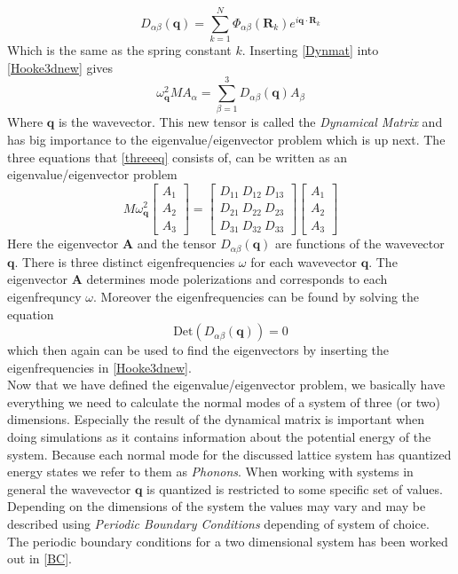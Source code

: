 \begin{equation}
    D_{\alpha\beta}(\mathbf{q})=\sum_{k=1}^{N}\Phi_{\alpha\beta}(\mathbf{R}_{k})e^{i\mathbf{q}\cdot\mathbf{R}_{k}}\label{Dynmat}
\end{equation}
Which is the same as the spring constant $k$. Inserting \cref{Dynmat} into \cref{Hooke3dnew} gives
\begin{equation}
    \omega_{\mathbf{q}}^{2}MA_{\alpha}=\sum_{\beta=1}^{3}D_{\alpha\beta}(\mathbf{q})A_{\beta}\label{threeeq}
\end{equation}
Where $\mathbf{q}$ is the wavevector. This new tensor is called the \textit{Dynamical Matrix} and has big importance to the eigenvalue/eigenvector problem which is up next. The three equations that \cref{threeeq} consists of, can be written as an eigenvalue/eigenvector problem
\begin{equation}
    M\omega_{\mathbf{q}}^{2}
    \begin{bmatrix}
           A_{1} \\
           A_{2} \\
           A_{3}
         \end{bmatrix}=\begin{bmatrix}
           D_{11} \ D_{12} \ D_{13}\\
           D_{21} \ D_{22} \ D_{23}\\
           D_{31} \ D_{32} \ D_{33}
         \end{bmatrix}\begin{bmatrix}
           A_{1} \\
           A_{2} \\
           A_{3}
         \end{bmatrix}
\end{equation}
Here the eigenvector $\mathbf{A}$ and the tensor $D_{\alpha\beta}(\mathbf{q})$ are functions of the wavevector $\mathbf{q}$. There is three distinct eigenfrequencies $\omega$ for each wavevector $\mathbf{q}$. The eigenvector $\mathbf{A}$ determines mode polerizations and corresponds to each eigenfrequncy $\omega$. Moreover the eigenfrequencies can be found by solving the equation
\begin{equation}
    \text{Det}(D_{\alpha\beta}(\mathbf{q}))=0 
\end{equation}
which then again can be used to find the eigenvectors by inserting the eigenfrequencies in \cref{Hooke3dnew}. \\
Now that we have defined the eigenvalue/eigenvector problem, we basically have everything we need to calculate the normal modes of a system of three (or two) dimensions. Especially the result of the dynamical matrix is important when doing simulations as it contains information about the potential energy of the system. Because each normal mode for the discussed lattice system has quantized energy states we refer to them as \textit{Phonons}. When working with systems in general the wavevector $\mathbf{q}$ is quantized is restricted to some specific set of values. Depending on the dimensions of the system the values may vary and may be described using \textit{Periodic Boundary Conditions} depending of system of choice. The periodic boundary conditions for a two dimensional system has been worked out in \cref{BC}. 
 
